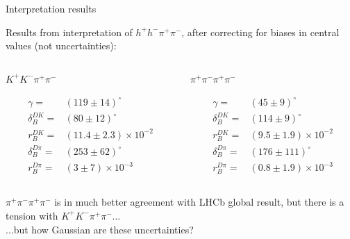 \documentclass[xcolor={dvipsnames}]{beamer}
\begin{document}
\begin{frame}{Interpretation results}
  \begin{center}
    {\large Results from interpretation of $h^+h^-\pi^+\pi^-$, after correcting for biases in central values (not uncertainties):}
  \end{center}
  \vspace{-0.5cm}
  \begin{columns}
    \begin{column}{0.5\textwidth}
      \begin{center}
        $K^+K^-\pi^+\pi^-$
      \end{center}
      \begin{align*}
        \gamma =& (119 \pm 14)^\circ \\
        \delta_B^{DK} =& (80 \pm 12)^\circ \\
        r_B^{DK} =& (11.4 \pm 2.3)\times10^{-2} \\
        \delta_B^{D\pi} =& (253 \pm 62)^\circ \\
        r_B^{D\pi} =& (3 \pm 7)\times10^{-3}
      \end{align*}
    \end{column}
    \begin{column}{0.5\textwidth}
      \begin{center}
        $\pi^+\pi^-\pi^+\pi^-$
      \end{center}
      \begin{align*}
        \gamma =& (45 \pm 9)^\circ \\
        \delta_B^{DK} =& (114 \pm 9)^\circ \\
        r_B^{DK} =& (9.5 \pm 1.9)\times10^{-2} \\
        \delta_B^{D\pi} =& (176 \pm 111)^\circ \\
        r_B^{D\pi} =& (0.8 \pm 1.9)\times10^{-3}
      \end{align*}
    \end{column}
  \end{columns}
  \vspace{0.3cm}
  \begin{center}
    $\pi^+\pi^-\pi^+\pi^-$ is in much better agreement with LHCb global result, but there is a tension with $K^+K^-\pi^+\pi^-$...\\
    ...but how Gaussian are these uncertainties?
  \end{center}
\end{frame}
\end{document}
